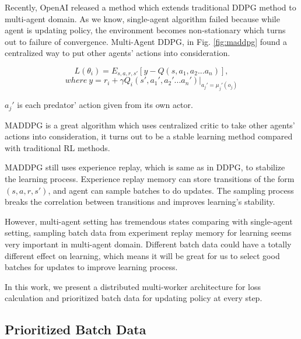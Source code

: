 \documentclass[11pt,twocolumn]{jarticle} %
\begin{document}
Recently, OpenAI released a method which extends traditional DDPG method to multi-agent domain\cite{maddpg}. As we know, single-agent algorithm failed because while agent is updating policy, the environment becomes non-stationary which turns out to failure of convergence. Multi-Agent DDPG, in Fig. \ref{fig:maddpg} found a centralized way to put other agents’ actions into consideration.

\begin{equation}
L(\theta_i) = E_{s,a,r,s'}[y - Q(s, a_1, a_2 ... a_n)],  
\end{equation}
$$where\ y = r_i + \gamma{Q_i}(s', a_1', a_2' ... a_n') | _{a_j'=\mu_j'(o_j)}$$

$a_j'$ is each predator' action given from its own actor. \par
MADDPG is a great algorithm which uses centralized critic to take other agents' actions into consideration, it turns out to be a stable learning method compared with traditional RL methods. \par

MADDPG still uses experience replay, which is same as in DDPG, to stabilize the learning process. Experience replay\cite{replay} memory can store transitions of the form $(s,a,r,s')$, and agent can sample batches to do updates. The sampling process breaks the correlation between transitions and improves learning's stability. \par

However, multi-agent setting has tremendous states comparing with single-agent setting, sampling batch data from experiment replay memory for learning seems very important in multi-agent domain. Different batch data could have a totally different effect on learning, which means it will be great for us to select good batches for updates to improve learning process. \par

In this work, we present a distributed multi-worker architecture for loss calculation and prioritized batch data for updating policy at every step.

\subsection{Prioritized Batch Data}
\end{document}
